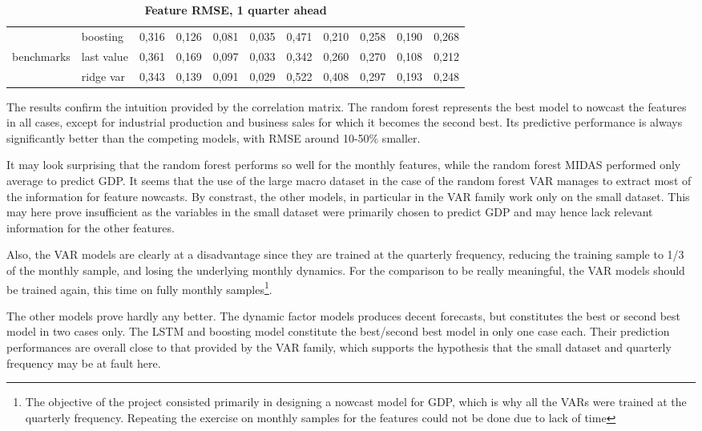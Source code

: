 \begin{table}[H]
{\begin{tabular}{@{} llccccccccc @{}}
& boosting & 0,316 & 0,126 & 0,081 & 0,035 & 0,471 & \colorbox{coolyellow}{0,210} & 0,258 & 0,190 & 0,268 \\
\cmidrule{1-11}
\multirow{2}{*}{benchmarks} & last value & 0,361 & 0,169 & 0,097 & 0,033 & 0,342 & 0,260 & 0,270 & \colorbox{coolyellow}{0,108} & \colorbox{coolyellow}{0,212} \\
& ridge var & 0,343 & 0,139 & 0,091 & 0,029 & 0,522 & 0,408 & 0,297 & 0,193 & 0,248 \\
\bottomrule[0.5mm]
\end{tabular}}
\captionsetup{justification=centering}
\caption{\textbf{Feature RMSE, 1 quarter ahead}}
\label{table_c4_s4_1}
\end{table}


The results confirm the intuition provided by the correlation matrix. The random forest represents the best model to nowcast the features in all cases, except for industrial production and business sales for which it becomes the second best. Its predictive performance is always significantly better than the competing models, with RMSE around 10-50\% smaller. 

It may look surprising that the random forest performs so well for the monthly features, while the random forest MIDAS performed only average to predict GDP. It seems that the use of the large macro dataset in the case of the random forest VAR manages to extract most of the information for feature nowcasts. By constrast, the other models, in particular in the VAR family work only on the small dataset. This may here prove insufficient as the variables in the small dataset were primarily chosen to predict GDP and may hence lack relevant information for the other features. 

\newpage

Also, the VAR models are clearly at a disadvantage since they are trained at the quarterly frequency, reducing the training sample to 1/3 of the monthly sample, and losing the underlying monthly dynamics. For the comparison to be really meaningful, the VAR models should be trained again, this time on fully monthly samples\footnote{The objective of the project consisted primarily in designing a nowcast model for GDP, which is why all the VARs were trained at the quarterly frequency. Repeating the exercise on monthly samples for the features could not be done due to lack of time}.

The other models prove hardly any better. The dynamic factor models produces decent forecasts, but constitutes the best or second best model in two cases only. The LSTM and boosting model constitute the best/second best model in only one case each. Their prediction performances are overall close to that provided by the VAR family, which supports the hypothesis that the small dataset and quarterly frequency may be at fault here.

